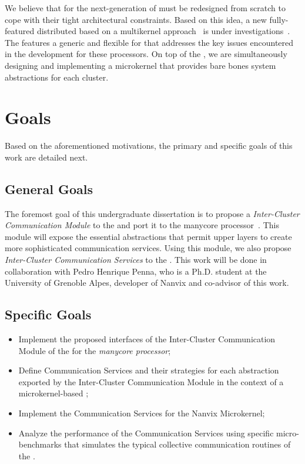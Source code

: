 	We believe that \oss for the next-generation of \lightweight \manycores must be
	redesigned from scratch to cope with their tight architectural constraints.
	Based on this idea, a new fully-featured distributed \os based on a multikernel approach~\cite{Baumann2009}
	is under investigations~\cite{penna2017-1,penna2017-2,penna2019}.
	The \nanvix \multikernel features a generic and flexible \hal for \lightweight \manycores that
	addresses the key issues encountered in the development for these processors.
	On top of the \nanvix \textit{\hal}, we are simultaneously designing and implementing a microkernel
	that provides bare bones system abstractions for each cluster.

\section{Goals}
\label{sec.goals}

	Based on the aforementioned motivations, the primary and specific goals of this work are detailed next.

\subsection{General Goals}
\label{sec.goals.general}

	The foremost goal of this undergraduate dissertation is to propose a \textit{Inter-Cluster Communication Module}
	to the \nanvix \textit{\hal} and port it to the \mppa manycore processor~\cite{DeDinechin2013-1}.
	This module will expose the essential abstractions that permit upper layers to create more
	sophisticated communication services.
	Using this module, we also propose \textit{Inter-Cluster Communication Services} to the \nanvix \microkernel.
	This work will be done in collaboration with Pedro Henrique Penna, who is a Ph.D. student at the
	University of Grenoble Alpes, developer of Nanvix and co-advisor of this work.

\subsection{Specific Goals}
\label{sec.goals.specific}

	\begin{itemize}
		\item Implement the proposed interfaces of the Inter-Cluster Communication Module of the \hal 
			for the \textit{\mppa manycore processor};
		\item Define Communication Services and their strategies for each abstraction exported
			by the Inter-Cluster Communication Module in the context of a microkernel-based \os;
		\item Implement the Communication Services for the Nanvix Microkernel;
		\item Analyze the performance of the Communication Services using specific micro-benchmarks
			that simulates the typical collective communication routines of the \mpi.
	\end{itemize}

